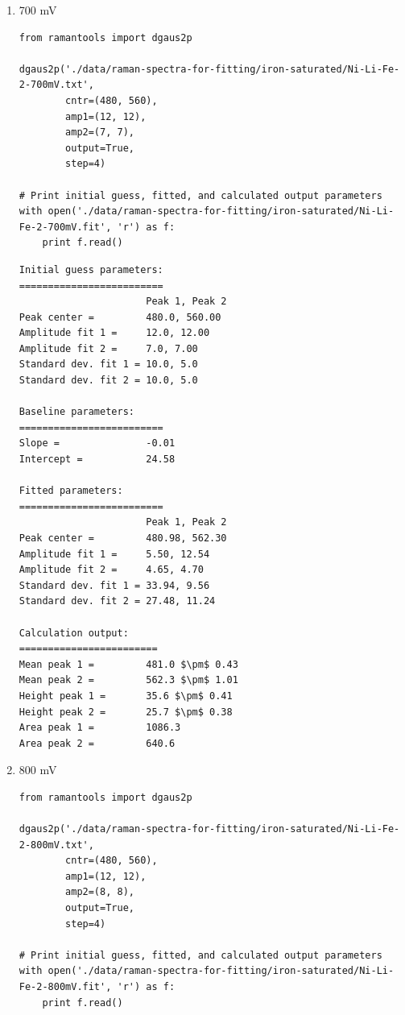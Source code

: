 \documentclass[journal=jpccck,manuscript=suppinfo,email=true]{achemso}
\begin{document}
\begin{enumerate}
\begin{enumerate}
\begin{enumerate}
\item 700 mV
\label{sec-4-2-0-1-2-2}
\begin{verbatim}
from ramantools import dgaus2p

dgaus2p('./data/raman-spectra-for-fitting/iron-saturated/Ni-Li-Fe-2-700mV.txt',
        cntr=(480, 560),
        amp1=(12, 12),
        amp2=(7, 7),
        output=True,
        step=4)

# Print initial guess, fitted, and calculated output parameters
with open('./data/raman-spectra-for-fitting/iron-saturated/Ni-Li-Fe-2-700mV.fit', 'r') as f:
    print f.read()
\end{verbatim}

\begin{verbatim}
Initial guess parameters:
=========================
                      Peak 1, Peak 2
Peak center =         480.0, 560.00
Amplitude fit 1 =     12.0, 12.00
Amplitude fit 2 =     7.0, 7.00
Standard dev. fit 1 = 10.0, 5.0
Standard dev. fit 2 = 10.0, 5.0

Baseline parameters:
=========================
Slope =               -0.01
Intercept =           24.58

Fitted parameters:
=========================
                      Peak 1, Peak 2
Peak center =         480.98, 562.30
Amplitude fit 1 =     5.50, 12.54
Amplitude fit 2 =     4.65, 4.70
Standard dev. fit 1 = 33.94, 9.56
Standard dev. fit 2 = 27.48, 11.24

Calculation output:
========================
Mean peak 1 =         481.0 $\pm$ 0.43
Mean peak 2 =         562.3 $\pm$ 1.01
Height peak 1 =       35.6 $\pm$ 0.41
Height peak 2 =       25.7 $\pm$ 0.38
Area peak 1 =         1086.3
Area peak 2 =         640.6
\end{verbatim}

\item 800 mV
\label{sec-4-2-0-1-2-3}
\begin{verbatim}
from ramantools import dgaus2p

dgaus2p('./data/raman-spectra-for-fitting/iron-saturated/Ni-Li-Fe-2-800mV.txt',
        cntr=(480, 560),
        amp1=(12, 12),
        amp2=(8, 8),
        output=True,
        step=4)

# Print initial guess, fitted, and calculated output parameters
with open('./data/raman-spectra-for-fitting/iron-saturated/Ni-Li-Fe-2-800mV.fit', 'r') as f:
    print f.read()
\end{verbatim}


\end{enumerate}
\end{enumerate}
\end{enumerate}
\end{document}
